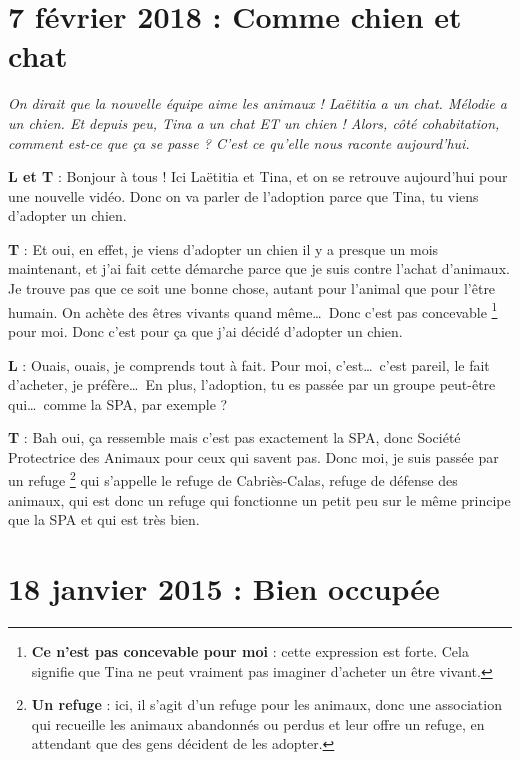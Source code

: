 \documentclass[11pt, french]{report}
\begin{document}
\chapter{7 février 2018 : Comme chien et chat}

\textit{On dirait que la nouvelle équipe aime les animaux ! Laëtitia a
  un chat. Mélodie a un chien. Et depuis peu, Tina a un chat ET un chien !
  Alors, côté cohabitation, comment est-ce que ça se passe ? C'est ce
  qu'elle nous raconte aujourd'hui.}

\vfill

\textbf{L et T} : Bonjour à tous ! Ici Laëtitia et Tina, et on se retrouve
aujourd'hui pour une nouvelle vidéo. Donc on va parler de l'adoption parce
que Tina, tu viens d'adopter un chien.

\textbf{T} : Et oui, en effet, je viens d'adopter un chien il y a presque
un mois maintenant, et j'ai fait cette démarche parce que je suis contre
l'achat d'animaux. Je trouve pas que ce soit une bonne chose, autant pour
l'animal que pour l'être humain. On achète des êtres vivants quand
même\ldots\ Donc c'est pas concevable
\footnote{\textbf{Ce n'est pas concevable pour moi} : cette expression est
  forte. Cela signifie que Tina ne peut vraiment pas imaginer d’acheter un
  être vivant.} pour moi. Donc c'est pour ça que j'ai décidé d'adopter un
chien.

\textbf{L} : Ouais, ouais, je comprends tout à fait. Pour moi,
c’est\ldots\ c’est pareil, le fait d’acheter, je préfère\ldots\ En plus,
l’adoption, tu es passée par un groupe peut-être qui\ldots\ comme la SPA,
par exemple ?

\textbf{T} : Bah oui, ça ressemble mais c’est pas exactement la SPA, donc
Société Protectrice des Animaux pour ceux qui savent pas. Donc moi, je suis
passée par un refuge
\footnote{\textbf{Un refuge} : ici, il s’agit d’un refuge pour les animaux,
  donc une association qui recueille les animaux abandonnés ou perdus et
  leur offre un refuge, en attendant que des gens décident de les adopter.}
qui s’appelle le refuge de Cabriès-Calas, refuge de défense des animaux,
qui est donc un refuge qui fonctionne un petit peu sur le même principe
que la SPA et qui est très bien.

\vfill

\vfill

\vfill

\chapter{18 janvier 2015 : Bien occupée}
\end{document}
